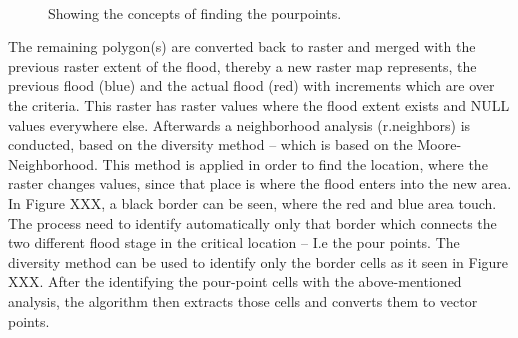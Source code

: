 \begin{figure}[h!]
  \myfloatalign
   \quad
   \\
  \caption[Generated extra pixels]{Showing the concepts of finding the pourpoints.}\label{fig:example}
\end{figure}


The remaining polygon(s) are converted back to raster and merged with the previous raster extent of the flood, thereby a new raster map represents, the previous flood (blue) and the actual flood (red) with increments which are over the criteria. This raster has raster values where the flood extent exists and NULL values everywhere else.
Afterwards a neighborhood analysis (r.neighbors) is conducted, based on the diversity method – which is based on the Moore-Neighborhood. This method is applied in order to find the location, where the raster changes values, since that place is where the flood enters into the new area. In Figure XXX, a black border can be seen, where the red and blue area touch. The process need to identify automatically only that border which connects the two different flood stage in the critical location – I.e the pour points. The diversity method can be used to identify only the border cells as it seen in Figure XXX.
After the identifying the pour-point cells with the above-mentioned analysis, the algorithm then extracts those cells and converts them to vector points. \\

